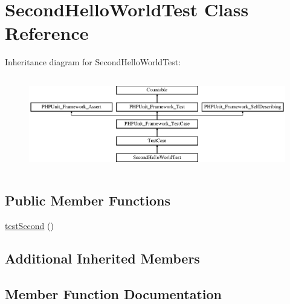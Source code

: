 \hypertarget{class_foo_1_1_data_provider_issue2922_1_1_second_hello_world_test}{}\section{Second\+Hello\+World\+Test Class Reference}
\label{class_foo_1_1_data_provider_issue2922_1_1_second_hello_world_test}
Inheritance diagram for Second\+Hello\+World\+Test\+:\begin{figure}[H]
\begin{center}
\leavevmode
\includegraphics[height=4.129793cm]{class_foo_1_1_data_provider_issue2922_1_1_second_hello_world_test}
\end{center}
\end{figure}
\subsection*{Public Member Functions}
\begin{DoxyCompactItemize}
\item 
\mbox{\hyperlink{class_foo_1_1_data_provider_issue2922_1_1_second_hello_world_test_a2446a8b0d0707750a27e316538ba9677}{test\+Second}} ()
\end{DoxyCompactItemize}
\subsection*{Additional Inherited Members}


\subsection{Member Function Documentation}
\mbox{\label{class_foo_1_1_data_provider_issue2922_1_1_second_hello_world_test_a2446a8b0d0707750a27e316538ba9677}} 
